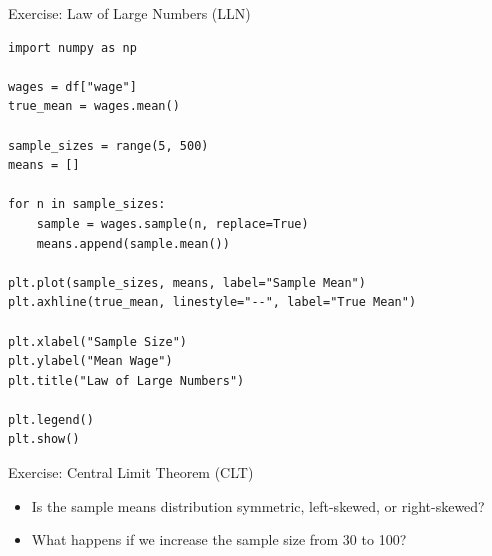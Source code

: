 \documentclass{beamer}
\begin{document}
\begin{frame}[fragile]{Exercise: Law of Large Numbers (LLN)}

\begin{verbatim}
import numpy as np

wages = df["wage"]
true_mean = wages.mean()

sample_sizes = range(5, 500)
means = []

for n in sample_sizes:
    sample = wages.sample(n, replace=True)
    means.append(sample.mean())

plt.plot(sample_sizes, means, label="Sample Mean")
plt.axhline(true_mean, linestyle="--", label="True Mean")

plt.xlabel("Sample Size")
plt.ylabel("Mean Wage")
plt.title("Law of Large Numbers")

plt.legend()
plt.show()
\end{verbatim}
    
\end{frame}

\begin{frame}[fragile]{Exercise: Central Limit Theorem (CLT)}

\begin{itemize}
    \item Is the sample means distribution symmetric, left-skewed, or right-skewed?
    \item What happens if we increase the sample size from 30 to 100?
\end{itemize}
    
\end{frame}
\end{document}
